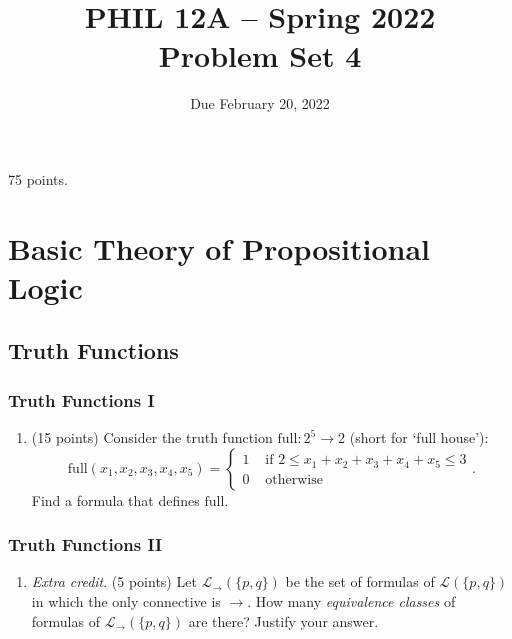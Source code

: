 \documentclass[english]{article}
\theoremstyle{definition}
\begin{document}
 
	
	\title{PHIL 12A -- Spring 2022 \\ Problem Set 4}
	\date{Due February 20, 2022}
	
	\maketitle
	
	
	\begin{center}75 points.\end{center}
	
	\setcounter{section}{1}
	
	\section{Basic Theory of Propositional Logic}
	
	\subsection{Truth Functions}
	
	\subsubsection{Truth Functions I}
	\begin{enumerate}[label=\arabic*.,ref=\arabic*,resume]
		\item (15 points) Consider the truth function $\mathrm{full}:2^5\to 2$ (short for `full house'):
		\[\mathrm{full}(x_1,x_2,x_3,x_4,x_5)=\begin{cases} 1&\mbox{ if }2\leq x_1+x_2+x_3+x_4+x_5\leq 3 \\ 0 &\mbox{ otherwise}   \end{cases}.\]
		Find a formula that defines $\mathrm{full}$.
	\end{enumerate}
	\subsubsection{Truth Functions II}
	
	\begin{enumerate}[label=\arabic*.,ref=\arabic*,resume]
		\item \textit{Extra credit}.  (5 points) Let $\mathcal{L}_\to(\{p,q\})$ be the set of formulas of $\mathcal{L}(\{p,q\})$ in which the only connective is $\to$. How many \textit{equivalence classes} of formulas of $\mathcal{L}_\to(\{p,q\})$ are there? Justify your answer.
	\end{enumerate}
	
\end{document}
